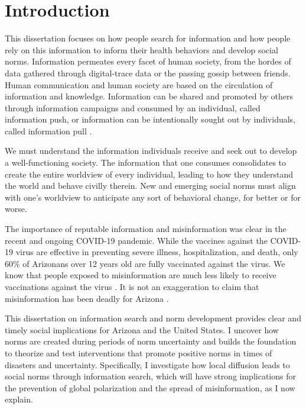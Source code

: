 \hypertarget{intro}
{\chapter{Introduction}\label{intro}}

This dissertation focuses on how people search for information and how people
rely on this information to inform their health behaviors and develop social
norms. Information permeates every facet of human society, from the hordes of
data gathered through digital-trace data or the passing gossip between friends.
Human communication and human society are based on the circulation of
information and knowledge. Information can be shared and promoted by others
through information campaigns and consumed by an individual, called information
push, or information can be intentionally sought out by individuals, 
called information pull \citep{cybenkoFoundationsInformationPush1999}.

We must understand the information individuals receive and seek out 
to develop a well-functioning society. The information that
one consumes consolidates to create the entire worldview of every individual,
leading to how they understand the world and behave civilly therein. New and
emerging social norms must align with one's worldview to anticipate any sort of 
behavioral change, for better or for worse. 

The importance of reputable information and misinformation was clear
in the recent and ongoing COVID-19 pandemic. While the vaccines against the
COVID-19 virus are effective in preventing severe illness, hospitalization, 
and death, only 60\% of Arizonans over 12 years old \citep{owid}
are fully vaccinated against the virus. We know that
people exposed to misinformation are much less likely to receive vaccinations
against the virus \citep{loombaMeasuringImpactCOVID192021}. It is not an
exaggeration to claim that misinformation has been deadly for Arizona
\citep{pathakInfodemicsCOVID19Role2020, greene_murphy21}.

This dissertation on information search and norm development provides clear and
timely social implications for Arizona and the United States. I
uncover how norms are created during periods of norm uncertainty and builds the
foundation to theorize and test interventions that promote positive norms in
times of disasters and uncertainty. Specifically, I investigate how local
diffusion leads to social norms through information search, which will have
strong implications for the prevention of global polarization and the spread of
misinformation, as I now explain. 

